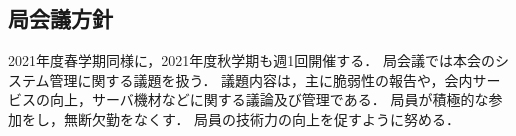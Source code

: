 \subsection*{局会議方針}

2021年度春学期同様に，2021年度秋学期も週1回開催する．
局会議では本会のシステム管理に関する議題を扱う．
議題内容は，主に脆弱性の報告や，会内サービスの向上，サーバ機材などに関する議論及び管理である．
局員が積極的な参加をし，無断欠勤をなくす．
局員の技術力の向上を促すように努める．

